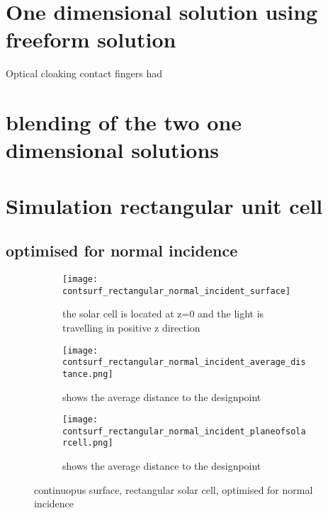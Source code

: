 \section{One dimensional solution using freeform solution}
Optical cloaking contact fingers had 
\section{blending of the two one dimensional solutions}

\section{Simulation rectangular unit cell}

\subsection{optimised for normal incidence}
\begin{figure}[h]
\centering
\begin{subfigure}{\textwidth}
\centering
\texttt{[image: contsurf\_rectangular\_normal\_incident\_surface]}
\caption{the solar cell is located at z=0 and the light is travelling in positive z direction\label{contsurf_rectangular_normal_incident_surface}}
\end{subfigure}
\begin{subfigure}{\textwidth}
\centering
\texttt{[image: contsurf\_rectangular\_normal\_incident\_average\_distance.png]}
\caption{shows the average distance to the designpoint \label{contsurf_rectangular_normal_incident_average_distance}}
\end{subfigure}
\begin{subfigure}{\textwidth}
\centering
\texttt{[image: contsurf\_rectangular\_normal\_incident\_planeofsolarcell.png]}
\caption{shows the average distance to the designpoint \label{contsurf_rectangular_normal_incident_planeofsolarcell}}
\end{subfigure}
\caption{continuopus surface, rectangular solar cell, optimised for normal incidence}
\end{figure}


